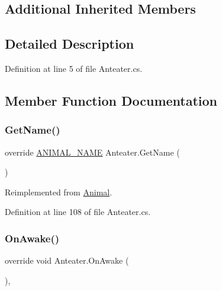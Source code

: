 \subsection*{Additional Inherited Members}


\subsection{Detailed Description}


Definition at line 5 of file Anteater.\+cs.



\subsection{Member Function Documentation}
\mbox{\label{class_anteater_a35cbc4139c1215562db29102ed07646a}} 
\subsubsection{\texorpdfstring{Get\+Name()}{GetName()}}
{\footnotesize\ttfamily override \mbox{\hyperlink{_animal_8cs_a2fa5713399b84d1b88dae9196837af50}{A\+N\+I\+M\+A\+L\+\_\+\+N\+A\+ME}} Anteater.\+Get\+Name (\begin{DoxyParamCaption}{ }\end{DoxyParamCaption})\hspace{0.3cm}{\ttfamily [virtual]}}



Reimplemented from \mbox{\hyperlink{class_animal_ab66ea3e3cb15a2b236ba9ba4d589ca69}{Animal}}.



Definition at line 108 of file Anteater.\+cs.

\mbox{\label{class_anteater_a616439e723d734df132d25a0a69f2e4a}} 
\subsubsection{\texorpdfstring{On\+Awake()}{OnAwake()}}
{\footnotesize\ttfamily override void Anteater.\+On\+Awake (\begin{DoxyParamCaption}{ }\end{DoxyParamCaption})\hspace{0.3cm}{\ttfamily [protected]}, {\ttfamily [virtual]}}



